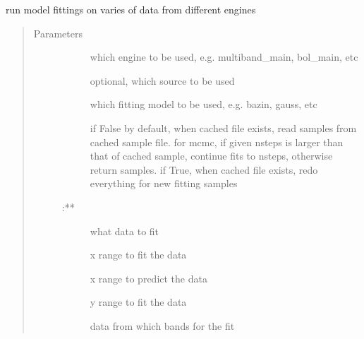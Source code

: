 \documentclass[letterpaper,10pt,english]{sphinxmanual}
\begin{document}
\begin{fulllineitems}
\begin{fulllineitems}
\label{\detokenize{generated/sdapy.snerun.snobject.run_fit:sdapy.snerun.snobject.run_fit}}
run model fittings on varies of data from different engines
\begin{quote}\begin{description}
\item[{Parameters}] \leavevmode\begin{description}
\item[{}] \leavevmode{[}\sphinxtitleref{str}{]}
which engine to be used, e.g. multiband\_main, bol\_main, etc

\item[{}] \leavevmode{[}\sphinxtitleref{str}{]}
optional, which source to be used

\item[{}] \leavevmode{[}\sphinxtitleref{str}{]}
which fitting model to be used, e.g. bazin, gauss, etc

\item[{}] \leavevmode{[}\sphinxtitleref{bool}{]}
if False by default, when cached file exists, read samples from cached sample file. for mcmc, if given nsteps is larger than that of cached sample, continue fits to nsteps, otherwise return samples. if True, when cached file exists, redo everything for new fitting samples

\item[{ :**}] \leavevmode
\item[{}] \leavevmode{[}\sphinxtitleref{str}{]}
what data to fit

\item[{}] \leavevmode{[}\sphinxtitleref{list}{]}
x range to fit the data

\item[{}] \leavevmode{[}\sphinxtitleref{list}{]}
x range to predict the data

\item[{}] \leavevmode{[}\sphinxtitleref{list}{]}
y range to fit the data

\item[{}] \leavevmode{[}\sphinxtitleref{list}{]}
data from which bands for the fit


\end{description}
\end{description}
\end{quote}
\end{fulllineitems}
\end{fulllineitems}
\end{document}

